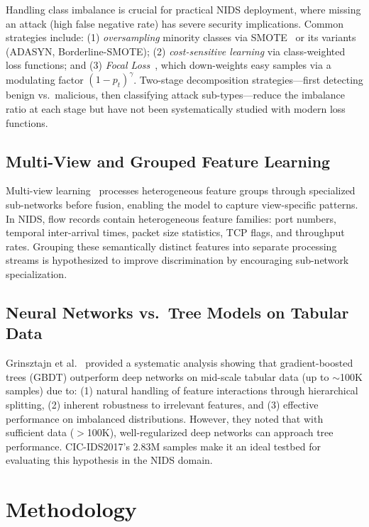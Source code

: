 \documentclass[12pt]{article}
\begin{document}
Handling class imbalance is crucial for practical NIDS deployment, where missing an attack (high false negative rate) has severe security implications. Common strategies include: (1) \emph{oversampling} minority classes via SMOTE~\cite{chawla2002smote} or its variants (ADASYN, Borderline-SMOTE); (2) \emph{cost-sensitive learning} via class-weighted loss functions; and (3) \emph{Focal Loss}~\cite{lin2017focal}, which down-weights easy samples via a modulating factor $(1-p_t)^\gamma$. Two-stage decomposition strategies---first detecting benign vs.\ malicious, then classifying attack sub-types---reduce the imbalance ratio at each stage but have not been systematically studied with modern loss functions.

\subsection{Multi-View and Grouped Feature Learning}
\label{subsec:multiview}

Multi-view learning~\cite{baltrusaitis2018multimodal} processes heterogeneous feature groups through specialized sub-networks before fusion, enabling the model to capture view-specific patterns. In NIDS, flow records contain heterogeneous feature families: port numbers, temporal inter-arrival times, packet size statistics, TCP flags, and throughput rates. Grouping these semantically distinct features into separate processing streams is hypothesized to improve discrimination by encouraging sub-network specialization.

\subsection{Neural Networks vs.\ Tree Models on Tabular Data}
\label{subsec:tabular}

Grinsztajn et al.~\cite{grinsztajn2022why} provided a systematic analysis showing that gradient-boosted trees (GBDT) outperform deep networks on mid-scale tabular data (up to $\sim$100K samples) due to: (1) natural handling of feature interactions through hierarchical splitting, (2) inherent robustness to irrelevant features, and (3) effective performance on imbalanced distributions. However, they noted that with sufficient data ($>$100K), well-regularized deep networks can approach tree performance. CIC-IDS2017's 2.83M samples make it an ideal testbed for evaluating this hypothesis in the NIDS domain.

\section{Methodology}
\label{sec:method}
\end{document}
